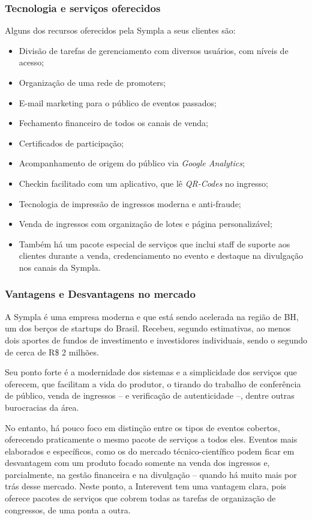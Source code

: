 \documentclass[12pt,a4paper,twoside,hyphens,english,brazil]{abntex2}
\begin{document}
\subsubsection*{Tecnologia e serviços oferecidos}
Alguns dos recursos oferecidos pela Sympla a seus clientes são\cite{sympla-features}:
\begin{itemize}[itemsep=-1ex]
	\item Divisão de tarefas de gerenciamento com diversos usuários, com níveis de acesso;
	\item Organização de uma rede de promoters;
	\item E-mail marketing para o público de eventos passados;
	\item Fechamento financeiro de todos os canais de venda;
	\item Certificados de participação;
	\item Acompanhamento de origem do público via \emph{Google Analytics};
	\item Checkin facilitado com um aplicativo, que lê \emph{QR-Codes} no ingresso;
	\item Tecnologia de impressão de ingressos moderna e anti-fraude;
	\item Venda de ingressos com organização de lotes e página personalizável;
	\item Também há um pacote especial de serviços que inclui staff de suporte aos clientes durante a venda, credenciamento no evento e destaque na divulgação nos canais da Sympla.
\end{itemize}

\subsubsection*{Vantagens e Desvantagens no mercado}
A Sympla é uma empresa moderna e que está sendo acelerada na região de BH, um dos berços de startups do Brasil. Recebeu, segundo estimativas, ao menos dois aportes de fundos de investimento e investidores individuais, sendo o segundo de cerca de R\$ 2 milhões.\cite{sympla-aporte}

Seu ponto forte é a modernidade dos sistemas e a simplicidade dos serviços que oferecem, que facilitam a vida do produtor, o tirando do trabalho de conferência de público, venda de ingressos -- e verificação de autenticidade --, dentre outras burocracias da área.

No entanto, há pouco foco em distinção entre os tipos de eventos cobertos, oferecendo praticamente o mesmo pacote de serviços a todos eles. Eventos mais elaborados e específicos, como os do mercado técnico-científico podem ficar em desvantagem com um produto focado somente na venda dos ingressos e, parcialmente, na gestão financeira e na divulgação -- quando há muito mais por trás desse mercado. Neste ponto, a Interevent tem uma vantagem clara, pois oferece pacotes de serviços que cobrem todas as tarefas de organização de congressos, de uma ponta a outra.
\end{document}
